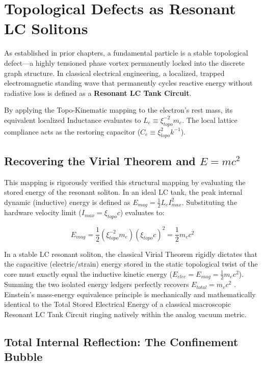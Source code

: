 \section{Topological Defects as Resonant LC Solitons}

As established in prior chapters, a fundamental particle is a stable topological defect---a highly
tensioned phase vortex permanently locked into the discrete graph structure. In classical
electrical engineering, a localized, trapped electromagnetic standing wave that permanently
cycles reactive energy without radiative loss is defined as a \textbf{Resonant LC Tank Circuit}.

By applying the Topo-Kinematic mapping to the electron's rest mass, its equivalent localized
Inductance evaluates to $L_e \equiv \xi_{topo}^{-2} m_e$. The local lattice compliance acts as the restoring
capacitor ($C_e \equiv \xi_{topo}^2 k^{-1}$).

\subsection{Recovering the Virial Theorem and $E=mc^2$}

This mapping is rigorously verified this structural mapping by evaluating the stored energy of the
resonant soliton. In an ideal LC tank, the peak internal dynamic (inductive) energy is defined
as $E_{mag} = \frac{1}{2} L_e I_{max}^2$. Substituting the hardware velocity limit ($I_{max} = \xi_{topo} c$) evaluates to:

\begin{equation}
E_{mag} = \frac{1}{2} (\xi_{topo}^{-2} m_e)(\xi_{topo} c)^2 = \frac{1}{2} m_e c^2
\end{equation}

In a stable LC resonant soliton, the classical Virial Theorem rigidly dictates that the
capacitive (electric/strain) energy stored in the static topological twist of the core must exactly
equal the inductive kinetic energy ($E_{elec} = E_{mag} = \frac{1}{2}m_e c^2$). Summing the two isolated energy
ledgers perfectly recovers $E_{total} = m_e c^2$ \cite{einstein1916}. Einstein's mass-energy equivalence principle is
mechanically and mathematically identical to the Total Stored Electrical Energy of a classical
macroscopic Resonant LC Tank Circuit ringing natively within the analog vacuum metric.

\subsection{Total Internal Reflection: The Confinement Bubble}

